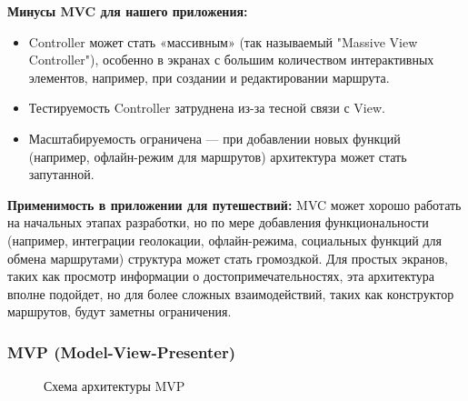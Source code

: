 \textbf{Минусы MVC для нашего приложения:}
\begin{itemize}
    \item Controller может стать «массивным» (так называемый "Massive View Controller"), особенно в экранах с большим количеством интерактивных элементов, например, при создании и редактировании маршрута.
    \item Тестируемость Controller затруднена из-за тесной связи с View.
    \item Масштабируемость ограничена — при добавлении новых функций (например, офлайн-режим для маршрутов) архитектура может стать запутанной.
\end{itemize}

\textbf{Применимость в приложении для путешествий:}
MVC может хорошо работать на начальных этапах разработки, но по мере добавления функциональности (например, интеграции геолокации, офлайн-режима, социальных функций для обмена маршрутами) структура может стать громоздкой. Для простых экранов, таких как просмотр информации о достопримечательностях, эта архитектура вполне подойдет, но для более сложных взаимодействий, таких как конструктор маршрутов, будут заметны ограничения.

\subsubsection*{MVP (Model-View-Presenter)}

\begin{figure}[H]
\centering
{}
\caption{Схема архитектуры MVP}
\label{fig:mvp}
\end{figure}


